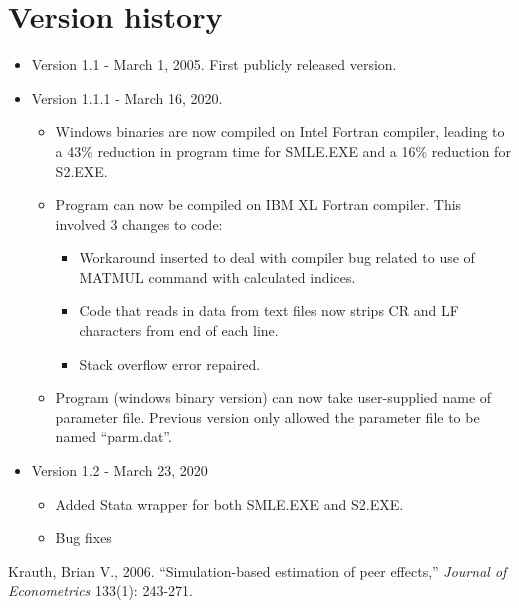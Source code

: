 \documentclass{article}
\begin{document}
\section{Version history}

\begin{itemize}
	\item Version 1.1 - March 1, 2005. First publicly released version.
	\item Version 1.1.1 - March 16, 2020.
		\begin{itemize}
			\item Windows binaries are now compiled on Intel Fortran compiler, leading to 
				a 43\% reduction in program time for SMLE.EXE and a 16\% reduction
				for S2.EXE.
			\item Program can now be compiled on IBM XL Fortran compiler.  This involved 3 changes to code:
				\begin{itemize}
					\item Workaround inserted to deal with compiler bug related to use of
						MATMUL command with calculated indices.
					\item Code that reads in data from text files now strips CR and LF characters from
						end of each line.
					\item Stack overflow error repaired.  
				\end{itemize}
			\item Program (windows binary version) can now take user-supplied name of parameter file.  
					Previous version only allowed the parameter file to be named ``parm.dat''.  
		\end{itemize}
	\item Version 1.2 - March 23, 2020
		\begin{itemize}
			\item Added Stata wrapper for both SMLE.EXE and S2.EXE.
			\item Bug fixes
		\end{itemize}
\end{itemize}


\begin{thebibliography}{breitestes Label}
Krauth, Brian V., 2006.  ``Simulation-based estimation of peer effects,'' 
{\it Journal of Econometrics} 133(1): 243-271. 
	
\end{thebibliography}
\end{document}
